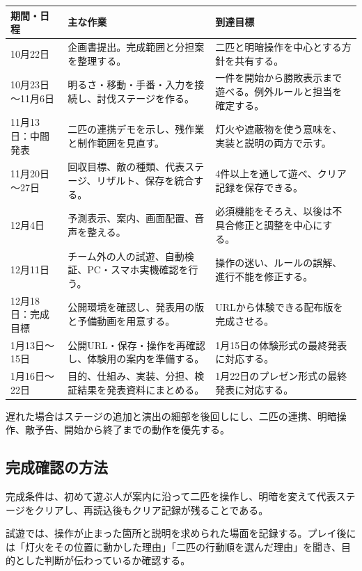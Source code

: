 \documentclass[a4paper,11pt,dvipdfmx]{jsarticle}
\begin{document}
{\small
\begin{longtable}{@{}P{0.20\dimexpr{}\tabcolsep\relax}P{0.34\dimexpr{}\tabcolsep\relax}P{0.46\dimexpr{}\tabcolsep\relax}@{}}
\toprule
\textbf{期間・日程} & \textbf{主な作業} & \textbf{到達目標} \\
\midrule
\endhead
10月22日 & 企画書提出。完成範囲と分担案を整理する。 & 二匹と明暗操作を中心とする方針を共有する。 \\
10月23日～11月6日 & 明るさ・移動・手番・入力を接続し、討伐ステージを作る。 & 一件を開始から勝敗表示まで遊べる。例外ルールと担当を確定する。 \\
11月13日：中間発表 & 二匹の連携デモを示し、残作業と制作範囲を見直す。 & 灯火や遮蔽物を使う意味を、実装と説明の両方で示す。 \\
11月20日～27日 & 回収目標、敵の種類、代表ステージ、リザルト、保存を統合する。 & 4件以上を通して遊べ、クリア記録を保存できる。 \\
12月4日 & 予測表示、案内、画面配置、音声を整える。 & 必須機能をそろえ、以後は不具合修正と調整を中心にする。 \\
12月11日 & チーム外の人の試遊、自動検証、PC・スマホ実機確認を行う。 & 操作の迷い、ルールの誤解、進行不能を修正する。 \\
12月18日：完成目標 & 公開環境を確認し、発表用の版と予備動画を用意する。 & URLから体験できる配布版を完成させる。 \\
1月13日～15日 & 公開URL・保存・操作を再確認し、体験用の案内を準備する。 & 1月15日の体験形式の最終発表に対応する。 \\
1月16日～22日 & 目的、仕組み、実装、分担、検証結果を発表資料にまとめる。 & 1月22日のプレゼン形式の最終発表に対応する。 \\
\bottomrule
\end{longtable}
}

遅れた場合はステージの追加と演出の細部を後回しにし、二匹の連携、明暗操作、敵予告、開始から終了までの動作を優先する。

\subsection{完成確認の方法}

完成条件は、初めて遊ぶ人が案内に沿って二匹を操作し、明暗を変えて代表ステージをクリアし、再読込後もクリア記録が残ることである。

試遊では、操作が止まった箇所と説明を求められた場面を記録する。プレイ後には「灯火をその位置に動かした理由」「二匹の行動順を選んだ理由」を聞き、目的とした判断が伝わっているか確認する。
\end{document}
